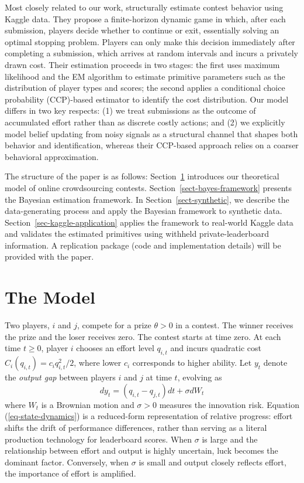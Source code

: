 \documentclass[mnsc]{informs3}
\begin{document}
Most closely related to our work, \citet{lemus2021dynamic} structurally estimate contest behavior using Kaggle data.
They propose a finite-horizon dynamic game in which, after each submission, players decide whether to continue or exit, essentially solving an optimal stopping problem.
Players can only make this decision immediately after completing a submission, which arrives at random intervals and incurs a privately drawn cost.
Their estimation proceeds in two stages: the first uses maximum likelihood and the EM algorithm to estimate primitive parameters such as the distribution of player types and scores; the second applies a conditional choice probability (CCP)-based estimator to identify the cost distribution.
Our model differs in two key respects:
(1) we treat submissions as the outcome of accumulated effort rather than as discrete costly actions; and
(2) we explicitly model belief updating from noisy signals as a structural channel that shapes both behavior and identification, whereas their CCP-based approach relies on a coarser behavioral approximation.







The structure of the paper is as follows:
Section~\ref{contest-theory} introduces our theoretical model of online crowdsourcing contests.
Section~\ref{sect-bayes-framework} presents the Bayesian estimation framework.
In Section~\ref{sect-synthetic}, we describe the data-generating process and apply the Bayesian framework to synthetic data.
Section~\ref{sec-kaggle-application} applies the framework to real-world Kaggle data and validates the estimated primitives using withheld private-leaderboard information.
A replication package (code and implementation details) will be provided with the paper.



\section{The Model}\label{contest-theory}

Two players, $i$ and $j$, compete for a prize $\theta>0$ in a contest.
The winner receives the prize and the loser receives zero.
The contest starts at time zero.
At each time $t\ge0$, player $i$ chooses an effort level $q_{i,t}$ and incurs quadratic cost $C_i(q_{i,t}) = c_i q_{i,t}^2/2$, where lower $c_i$ corresponds to higher ability.
Let $y_t$ denote the \textit{output gap} between players $i$ and $j$ at time $t$, evolving as
\begin{equation}\label{eq-state-dynamics}
	dy_t = (q_{i,t}-q_{j,t})dt + \sigma dW_t
\end{equation}
where $W_t$ is a Brownian motion and $\sigma>0$ measures the innovation risk.
Equation (\ref{eq-state-dynamics}) is a reduced-form representation of relative progress: effort shifts the drift of performance differences, rather than serving as a literal production technology for leaderboard scores.
When $\sigma$ is large and the relationship between effort and output is highly uncertain, luck becomes the dominant factor.
Conversely, when $\sigma$ is small and output closely reflects effort, the importance of effort is amplified.
\end{document}
